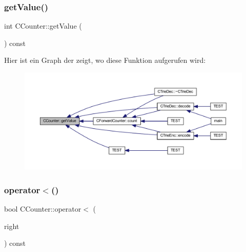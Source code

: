 \mbox{\label{class_c_counter_ad91db4cd517159f7cbb7d3976eede482}} 
\subsubsection{\texorpdfstring{get\+Value()}{getValue()}}
{\footnotesize\ttfamily int C\+Counter\+::get\+Value (\begin{DoxyParamCaption}{ }\end{DoxyParamCaption}) const}

Hier ist ein Graph der zeigt, wo diese Funktion aufgerufen wird\+:
\nopagebreak
\begin{figure}[H]
\begin{center}
\leavevmode
\includegraphics[width=350pt]{class_c_counter_ad91db4cd517159f7cbb7d3976eede482_icgraph}
\end{center}
\end{figure}
\mbox{\label{class_c_counter_a037e2875c6d72c03fc72cb3cf13f5636}} 
\subsubsection{\texorpdfstring{operator$<$()}{operator<()}}
{\footnotesize\ttfamily bool C\+Counter\+::operator$<$ (\begin{DoxyParamCaption}\item[{const \hyperlink{class_c_counter}{C\+Counter} \&}]{right }\end{DoxyParamCaption}) const}

\mbox{\label{class_c_counter_ab15aa17d719e8efa41d2d10d8bcac41c}} 

